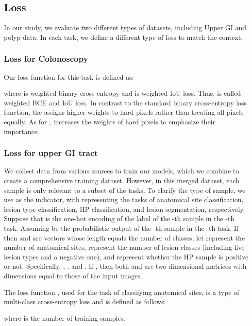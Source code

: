 \documentclass{article}
\begin{document}
\subsection{Loss}

In our study, we evaluate two different types of datasets, including Upper GI and polyp data. In each task, we define a different type of loss to match the context. 


\subsubsection{Loss for Colonoscopy}

Our loss function for this task is defined as: 


where  is weighted binary cross-entropy and  is weighted IoU loss. Thus,  is called weighted BCE and IoU loss. In contrast to the standard binary cross-entropy loss function, the  assigns higher weights to hard pixels rather than treating all pixels equally. As for , increases the weights of hard pixels to emphasize their importance.

\subsubsection{Loss for upper GI tract}

We collect data from various sources to train our models, which we combine to create a comprehensive training dataset. However, in this merged dataset, each sample is only relevant to a subset of the tasks. To clarify the type of sample, we use  as the indicator, with  representing the tasks of anatomical site classification, lesion type classification, HP classification, and lesion segmentation, respectively. Suppose that  is the one-hot encoding of the label of the -th sample in the -th task. Assuming  be the probabilistic output of the -th sample in the -th task. If  then  and  are vectors whose length equals the number of classes, let  represent the number of anatomical sites,  represent the number of lesion classes (including five lesion types and a negative one), and  represent whether the HP sample is positive or not. Specifically, , , and .
If , then both  and  are two-dimensional matrices with dimensions equal to those of the input images.

The loss function , used for the task of classifying anatomical sites, is a type of multi-class cross-entropy loss and is defined as follows:


where  is the number of training samples.
\end{document}

